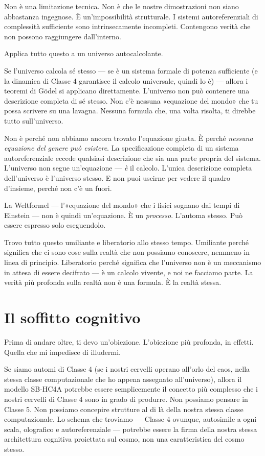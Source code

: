\documentclass[11pt, twoside, openright]{book}
\begin{document}
Non è una limitazione tecnica. Non è che le nostre dimostrazioni non siano abbastanza ingegnose. È un'impossibilità strutturale. I sistemi autoreferenziali di complessità sufficiente sono intrinsecamente incompleti. Contengono verità che non possono raggiungere dall'interno.

Applica tutto questo a un universo autocalcolante.

Se l'universo calcola sé stesso --- se è un sistema formale di potenza sufficiente (e la dinamica di Classe 4 garantisce il calcolo universale, quindi lo è) --- allora i teoremi di Gödel si applicano direttamente. L'universo non può contenere una descrizione completa di sé stesso. Non c'è nessuna «equazione del mondo» che tu possa scrivere su una lavagna. Nessuna formula che, una volta risolta, ti direbbe tutto sull'universo.

Non è perché non abbiamo ancora trovato l'equazione giusta. È perché \textit{nessuna equazione del genere può esistere}. La specificazione completa di un sistema autoreferenziale eccede qualsiasi descrizione che sia una parte propria del sistema. L'universo non segue un'equazione --- \textit{è} il calcolo. L'unica descrizione completa dell'universo è l'universo stesso. E non puoi uscirne per vedere il quadro d'insieme, perché non c'è un fuori.

La Weltformel --- l'«equazione del mondo» che i fisici sognano dai tempi di Einstein --- non è quindi un'equazione. È un \textit{processo}. L'automa stesso. Può essere espresso solo eseguendolo.

Trovo tutto questo umiliante e liberatorio allo stesso tempo. Umiliante perché significa che ci sono cose sulla realtà che non possiamo conoscere, nemmeno in linea di principio. Liberatorio perché significa che l'universo non è un meccanismo in attesa di essere decifrato --- è un calcolo vivente, e noi ne facciamo parte. La verità più profonda sulla realtà non è una formula. È la realtà stessa.


\section*{Il soffitto cognitivo}

Prima di andare oltre, ti devo un'obiezione. L'obiezione più profonda, in effetti. Quella che mi impedisce di illudermi.

Se siamo automi di Classe 4 (se i nostri cervelli operano all'orlo del caos, nella stessa classe computazionale che ho appena assegnato all'universo), allora il modello SB-HC4A potrebbe essere semplicemente il concetto più complesso che i nostri cervelli di Classe 4 sono in grado di produrre. Non possiamo pensare in Classe 5. Non possiamo concepire strutture al di là della nostra stessa classe computazionale. Lo schema che troviamo --- Classe 4 ovunque, autosimile a ogni scala, olografico e autoreferenziale --- potrebbe essere la firma della nostra stessa architettura cognitiva proiettata sul cosmo, non una caratteristica del cosmo stesso.
\end{document}
